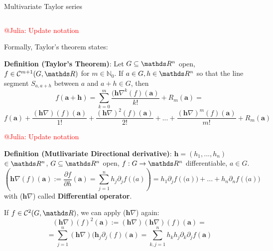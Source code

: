 \begin{vbframe}{Multivariate Taylor series}
\begin{columns}
\begin{column}{0.3\textwidth}
    \end{column}
  \end{columns}  


\framebreak  

\textcolor{red}{@Julia: Update notation}

Formally, Taylor's theorem states: 
    
\textbf{Definition (Taylor's Theorem)}: Let $G \subseteq \R^{n}$ open, $f \in \mathcal{C}^{m+1}(G,\R)$ for $m \in \mathbb{N}_0$.
If $a \in G, h \in \R^{n}$ so that the line segment $S_{a, a+h}$ between $a$ and $a+h \in G$, then
$$f(\bm{a+h}) = \sum_{k=0}^{m} \frac{(\bm{h}\nabla^{k}(f)(\bm{a})}{k!} + R_{m}(\bm{a}) = $$
$$f(\bm{a}) + \frac{(\bm{h}\nabla)(f)(\bm{a})}{1!} + \frac{(\bm{h}\nabla)^{2}(f)(\bm{a})}{2!} + ... + \frac{(\bm{h}\nabla)^{m}(f)(\bm{a})}{m!} + R_{m}(\bm{a})$$

\framebreak 

\textcolor{red}{@Julia: Update notation}

\textbf{Definition (Mutlivariate Directional derivative)}: $\bm{h} = (h_{1}, ..., h_{n})$ $\in \R^{n}$, $G \subseteq \R^{n}$ open, $f : G \rightarrow \R^{n}$ differentiable, $a \in G$.
$$(\bm{h}\nabla(f)(\bm{a}) := \frac{\partial f}{\partial h}(\bm{a}) = \sum_{j=1}^{n} h_{j}\partial_{j}f(\bm(a)) = h_{1}\partial_{j}f(\bm(a)) + ... + h_{n}\partial_{n}f(\bm(a))$$
with ($\bm{h}\nabla$) called \textbf{Differential operator}.

\vspace*{0.2cm}

If $f \in \mathcal{C}^{2}(G,\R)$, we can apply ($\bm{h}\nabla$) again:
$$(\bm{h}\nabla)(f)^{2}(\bm{a}) := (\bm{h}\nabla)(\bm{h}\nabla)(f)(\bm{a}) = $$
$$ = \sum_{j=1}^{n}(\bm{h}\nabla)(\bm{h}_{j}\partial_{j}(f)(\bm{a}) = \sum_{k,j=1}^{n}h_{k}h_{j}\partial_{k}\partial_{j}f(\bm{a})$$


\end{vbframe}


